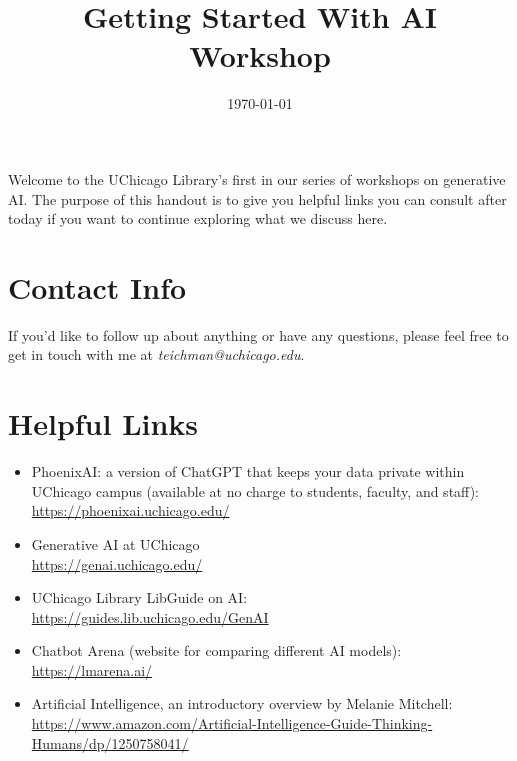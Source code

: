 \documentclass[11pt]{article}
\author{}
\date{\today}
\title{Getting Started With AI Workshop}
\begin{document}
\maketitle
Welcome to the UChicago Library's first in our series of workshops on
generative AI.  The purpose of this handout is to give you helpful
links you can consult after today if you want to continue exploring
what we discuss here.

\section{Contact Info}
\label{sec:org17b77db}

If you'd like to follow up about anything or have any questions,
please feel free to get in touch with me at \emph{teichman@uchicago.edu}.

\section{Helpful Links}
\label{sec:orgbfdfd15}

\begin{itemize}
\item PhoenixAI: a version of ChatGPT that keeps your data private within
UChicago campus (available at no charge to students, faculty, and
staff): \\ \url{https://phoenixai.uchicago.edu/}

\item Generative AI at UChicago \\ \url{https://genai.uchicago.edu/}

\item UChicago Library LibGuide on AI: \\
\url{https://guides.lib.uchicago.edu/GenAI}

\item Chatbot Arena (website for comparing different AI models): \\
\url{https://lmarena.ai/}

\item Artificial Intelligence, an introductory overview by Melanie
Mitchell: \\
\url{https://www.amazon.com/Artificial-Intelligence-Guide-Thinking-Humans/dp/1250758041/}
\end{itemize}
\end{document}
